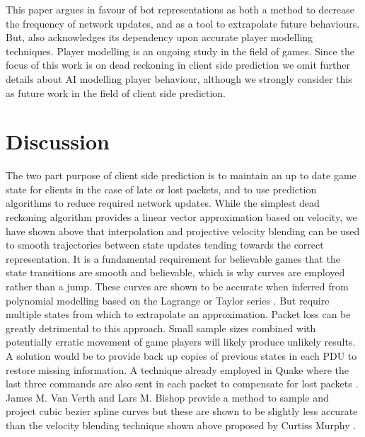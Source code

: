 \documentclass[journal]{IEEEtran}
\begin{document}
This paper argues in favour of bot representations as both a method to decrease the frequency of network updates, and as a tool to extrapolate future behaviours. But, also acknowledges its dependency upon accurate player modelling techniques. Player modelling is an ongoing study in the field of games. Since the focus of this work is on dead reckoning in client side prediction we omit further details about AI modelling player behaviour, although we strongly consider this as future work in the field of client side prediction.

\section{Discussion}

The two part purpose of client side prediction is to maintain an up to date game state for clients in the case of late or lost packets, and to use prediction algorithms to reduce required network updates. While the simplest dead reckoning algorithm provides a linear vector approximation based on velocity, we have shown above that interpolation and projective velocity blending can be used to smooth trajectories between state updates tending towards the correct representation. It is a fundamental requirement for believable games that the state transitions are smooth and believable, which is why curves are employed rather than a jump. These curves are shown to be accurate when inferred from polynomial modelling based on the Lagrange or Taylor series \cite{hanawa2006proposal}. But require multiple states from which to extrapolate an approximation. Packet loss can be greatly detrimental to this approach. Small sample sizes combined with potentially erratic movement of game players will likely produce unlikely results. A solution would be to provide back up copies of previous states in each PDU to restore missing information. A technique already employed in Quake where the last three commands are also sent in each packet to compensate for lost packets \cite{cronin2001distributed}. James M. Van Verth and Lars M. Bishop provide a method to sample and project cubic bezier spline curves \cite{van2008essential} but these are shown to be slightly less accurate than the velocity blending technique shown above proposed by Curtiss Murphy \cite{murphy2011believable}. 
\end{document}
